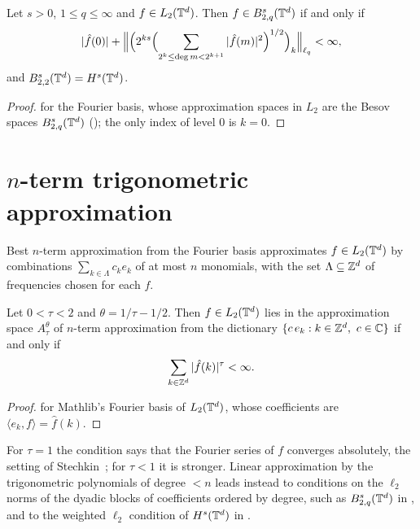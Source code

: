 \begin{theorem}
\label{thm:torus-coefficients}
\leanok
{}
Let $s > 0$, $1 \leq q \leq \infty$ and $f \in L_2(\mathbb{T}^d)$. Then $f \in
B^{s}_{2,q}(\mathbb{T}^d)$ if and only if
\[
  |\hat f(0)| + \Bigl\| \Bigl(2^{ks} \Bigl(\sum_{2^k \leq \deg m < 2^{k+1}} |\hat f(m)|^2
    \Bigr)^{1/2}\Bigr)_k \Bigr\|_{\ell_q} < \infty ,
\]
and $B^{s}_{2,2}(\mathbb{T}^d) = H^s(\mathbb{T}^d)$.
\end{theorem}

\begin{proof}
\leanok
{}
 for the Fourier basis, whose approximation spaces in $L_2$ are
the Besov spaces $B^{s}_{2,q}(\mathbb{T}^d)$ (); the only index of level $0$
is $k = 0$.
\end{proof}

\section{\texorpdfstring{$n$}{n}-term trigonometric approximation}
\label{sec:torus-nterm}

Best $n$-term approximation from the Fourier basis approximates $f \in L_2(\mathbb{T}^d)$ by
combinations $\sum_{k \in \Lambda} c_k e_k$ of at most $n$ monomials, with the set
$\Lambda \subseteq \mathbb{Z}^d$ of frequencies chosen for each $f$.

\begin{corollary}
\label{cor:torus-nterm}
\leanok
{}
Let $0 < \tau < 2$ and $\theta = 1/\tau - 1/2$. Then $f \in L_2(\mathbb{T}^d)$ lies in the
approximation space $A^\theta_\tau$ of $n$-term approximation from the dictionary
$\{c \, e_k : k \in \mathbb{Z}^d, \ c \in \mathbb{C}\}$ if and only if
\[
  \sum_{k \in \mathbb{Z}^d} |\hat f(k)|^\tau < \infty .
\]
\end{corollary}

\begin{proof}
\leanok
{} for Mathlib's Fourier basis of $L_2(\mathbb{T}^d)$, whose coefficients are
$\langle e_k, f \rangle = \hat f(k)$.
\end{proof}

For $\tau = 1$ the condition says that the Fourier series of $f$ converges absolutely, the
setting of Stechkin~\cite{Stechkin1955}; for $\tau < 1$ it is stronger. Linear approximation by
the trigonometric polynomials of degree $< n$ leads instead to conditions on the $\ell_2$ norms
of the dyadic blocks of coefficients ordered by degree, such as $B^{s}_{2,q}(\mathbb{T}^d)$ in
, and to the weighted $\ell_2$ condition of $H^s(\mathbb{T}^d)$ in
.

